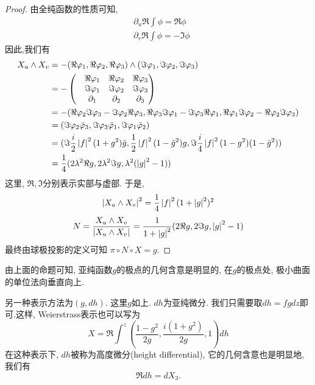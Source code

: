 \begin{proof}
    由全纯函数的性质可知, 
    \begin{align}
        &\partial_u \Re \int \phi= \Re \phi \\
        &\partial_v \Re \int \phi= -\Im \phi
    \end{align}
    因此,我们有
    \begin{equation}
        \begin{split}
            X_u \wedge X_v &= -(\Re \varphi_1,\Re \varphi_2, \Re \varphi_3) \wedge (\Im \varphi_1, \Im \varphi_2, \Im \varphi_3) \\
            &= - \begin{pmatrix}
                & \Re \varphi_1 & \Re \varphi_2 &\Re \varphi_3 \\
                & \Im \varphi_1 & \Im \varphi_2 &\Im \varphi_3 \\
                & \partial_1 & \partial_2 &\partial_3
            \end{pmatrix} \\
            &= - (\Re\varphi_2 \Im \varphi_3- \Im \varphi_2 \Re \varphi_3, \Re \varphi_3 \Im \varphi_1- \Im\varphi_3 \Re \varphi_1, \Re \varphi_1 \Im \varphi_2 - \Re\varphi_2 \Im \varphi_3) \\
            &= (\Im \varphi_2 \bar{\varphi}_3, \Im \varphi_3 \bar{\varphi}_1, \Im \varphi_1 \bar{\varphi}_2) \\
            &=(\Im \frac{i}{2}\left | f \right |^2(1+g^2)\bar{g}, \frac{1}{2}\left | f \right |^2(1-\bar{g}^2)g, \Im \frac{i}{4}\left | f \right |^2(1-g^2)(1-\bar{g}^2)) \\
            &= \frac{1}{4}(2\lambda^2\Re g, 2\lambda^2 \Im g, \lambda^2(\left | g \right |^2-1))
        \end{split}
    \end{equation}
    这里, $\Re, \Im$分别表示实部与虚部. 于是, 
    \begin{equation}
        \left | X_u \wedge X_v \right |^2=\frac{1}{4}\left | f \right |^2(1+\left | g \right |^2)^2
    \end{equation}
    \begin{equation}
        N=\frac{X_u\wedge X_v}{\left | X_u\wedge X_v \right |}= \frac{1}{1+\left | g \right |^2}(2\Re g, 2 \Im g, \left | g \right |^2-1)
    \end{equation}
    最终由球极投影的定义可知 $\pi\circ N \circ X=g$.
\end{proof}
由上面的命题可知, 亚纯函数$g$的极点的几何含意是明显的, 在$g$的极点处, 极小曲面的单位法向垂直向上.
\par 另一种表示方法为$(g,dh)$. 这里$g$如上. $dh$为亚纯微分. 我们只需要取$dh=fgdz$即可.这样, Weierstrass表示也可以写为
\begin{equation}
    X=\Re \int^z (\frac{1-g^2}{2g}, \frac{i(1+g^2)}{2g},1)dh
\end{equation}
在这种表示下, $dh$被称为高度微分(height differential), 它的几何含意也是明显地, 我们有
\begin{equation}
    \Re dh= dX_3.
\end{equation}
